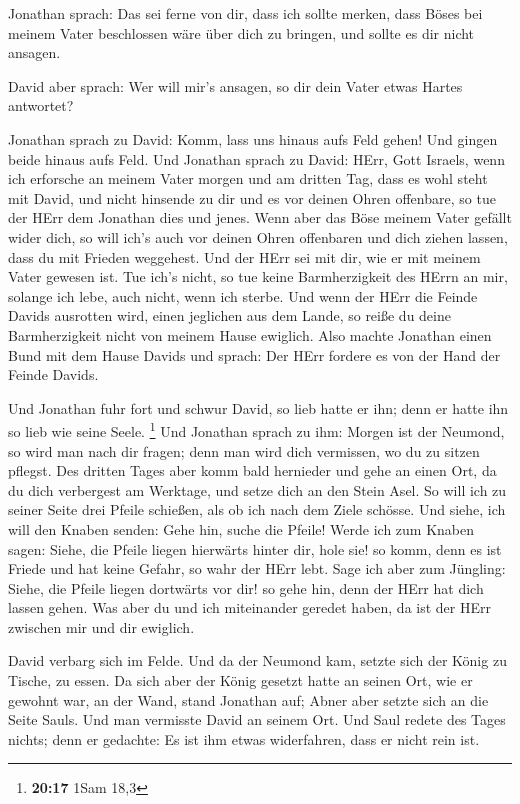  Jonathan sprach: Das sei ferne von dir, dass ich sollte
merken, dass Böses bei meinem Vater beschlossen wäre über dich zu
bringen, und sollte es dir nicht ansagen.

 David aber sprach: Wer will mir's ansagen, so dir dein
Vater etwas Hartes antwortet?

 Jonathan sprach zu David: Komm, lass uns hinaus aufs Feld
gehen! Und gingen beide hinaus aufs Feld.  Und Jonathan
sprach zu David: HErr, Gott Israels, wenn ich erforsche an meinem Vater
morgen und am dritten Tag, dass es wohl steht mit David, und nicht
hinsende zu dir und es vor deinen Ohren offenbare,  so tue
der HErr dem Jonathan dies und jenes. Wenn aber das Böse meinem Vater
gefällt wider dich, so will ich's auch vor deinen Ohren offenbaren und
dich ziehen lassen, dass du mit Frieden weggehest. Und der HErr sei mit
dir, wie er mit meinem Vater gewesen ist.  Tue ich's nicht,
so tue keine Barmherzigkeit des HErrn an mir, solange ich lebe, auch
nicht, wenn ich sterbe.  Und wenn der HErr die Feinde
Davids ausrotten wird, einen jeglichen aus dem Lande, so reiße du deine
Barmherzigkeit nicht von meinem Hause ewiglich.  Also
machte Jonathan einen Bund mit dem Hause Davids und sprach: Der HErr
fordere es von der Hand der Feinde Davids.

 Und Jonathan fuhr fort und schwur David, so lieb hatte er
ihn; denn er hatte ihn so lieb wie seine Seele. \footnote{\textbf{20:17}
  1Sam 18,3}  Und Jonathan sprach zu ihm: Morgen ist der
Neumond, so wird man nach dir fragen; denn man wird dich vermissen, wo
du zu sitzen pflegst.  Des dritten Tages aber komm bald
hernieder und gehe an einen Ort, da du dich verbergest am Werktage, und
setze dich an den Stein Asel.  So will ich zu seiner Seite
drei Pfeile schießen, als ob ich nach dem Ziele schösse. 
Und siehe, ich will den Knaben senden: Gehe hin, suche die Pfeile! Werde
ich zum Knaben sagen: Siehe, die Pfeile liegen hierwärts hinter dir,
hole sie! so komm, denn es ist Friede und hat keine Gefahr, so wahr der
HErr lebt.  Sage ich aber zum Jüngling: Siehe, die Pfeile
liegen dortwärts vor dir! so gehe hin, denn der HErr hat dich lassen
gehen.  Was aber du und ich miteinander geredet haben, da
ist der HErr zwischen mir und dir ewiglich.

 David verbarg sich im Felde. Und da der Neumond kam,
setzte sich der König zu Tische, zu essen.  Da sich aber
der König gesetzt hatte an seinen Ort, wie er gewohnt war, an der Wand,
stand Jonathan auf; Abner aber setzte sich an die Seite Sauls. Und man
vermisste David an seinem Ort.  Und Saul redete des Tages
nichts; denn er gedachte: Es ist ihm etwas widerfahren, dass er nicht
rein ist.

